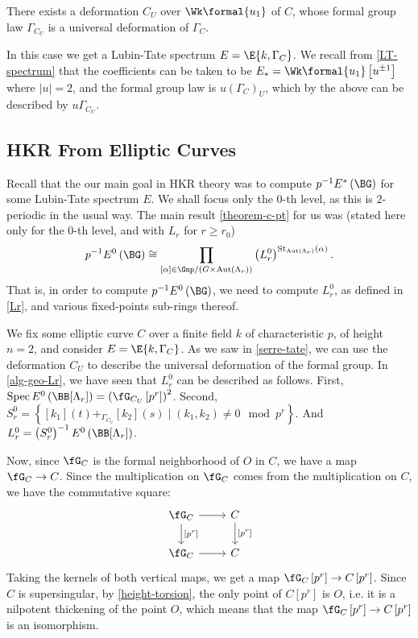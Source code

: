 \begin{theorem}\label{serre-tate}
	There exists a deformation $C_U$ over $\Wk\formal{u_1}$ of $C$, whose formal group law $\Gamma_{C_U}$ is a universal deformation of $\Gamma_C$.
\end{theorem}

In this case we get a Lubin-Tate spectrum $E = \E{k, \Gamma_C}$.
We recall from \ref{LT-spectrum} that the coefficients can be taken to be $E_* = \Wk\formal{u_1}\left[u^{\pm 1}\right]$ where $\left|u\right| = 2$, and the formal group law is $u\left(\Gamma_C\right)_U$, which by the above can be described by $u \Gamma_{C_U}$.



\subsection{HKR From Elliptic Curves}

Recall that the our main goal in HKR theory was to compute $p^{-1} E^*\left(\BG\right)$ for some Lubin-Tate spectrum $E$.
We shall focus only the $0$-th level, as this is $2$-periodic in the usual way.
The main result \ref{theorem-c-pt} for us was (stated here only for the $0$-th level, and with $L_r$ for $r \geq r_0$)
$$
p^{-1} E^0\left(\BG\right)
\cong \prod_{\left[\alpha\right] \in \Gnp/{\left(G \times \aut \left(\Lambda_r\right)\right)}}
\left(L_r^0\right)^{\stab_{\aut \left(\Lambda_r\right)}\left(\alpha\right)}.
$$
That is, in order to compute $p^{-1} E^0\left(\BG\right)$, we need to compute $L_r^0$, as defined in \ref{Lr}, and various fixed-points sub-rings thereof.

We fix some elliptic curve $C$ over a finite field $k$ of characteristic $p$, of height $n=2$, and consider $E = \E{k, \Gamma_C}$.
As we saw in \ref{serre-tate}, we can use the deformation $C_U$ to describe the universal deformation of the formal group.
In \ref{alg-geo-Lr}, we have seen that $L_r^0$ can be described as follows.
First, $\spec E^0\left(\BB[\Lambda_r]\right) = \left(\fG_{C_U}\left[p^r\right]\right)^2$.
Second, $S_r^0 = \left\{ [k_1]\left(t\right) +_{\Gamma_{C_U}} [k_2]\left(s\right) \mid \left(k_1, k_2\right) \neq 0 \mod p^r\right\}$.
And $L_r^0 = \left(S_r^0\right)^{-1} E^0\left(\BB[\Lambda_r]\right)$.

Now, since $\fG_C$ is the formal neighborhood of $O$ in $C$, we have a map $\fG_C \to C$.
Since the multiplication on $\fG_C$ comes from the multiplication on $C$, we have the commutative square:
$$
\begin{tikzcd}
	\fG_C \arrow{r}{} \arrow{d}{\left[p^r\right]} & C \arrow{d}{\left[p^r\right]} \\
	\fG_C \arrow{r}{} & C
\end{tikzcd}
$$
Taking the kernels of both vertical maps, we get a map $\fG_C\left[p^r\right] \to C\left[p^r\right]$.
Since $C$ is supersingular, by \ref{height-torsion}, the only point of $C\left[p^r\right]$ is $O$, i.e. it is a nilpotent thickening of the point $O$, which means that the map $\fG_C\left[p^r\right] \to C\left[p^r\right]$ is an isomorphism.

